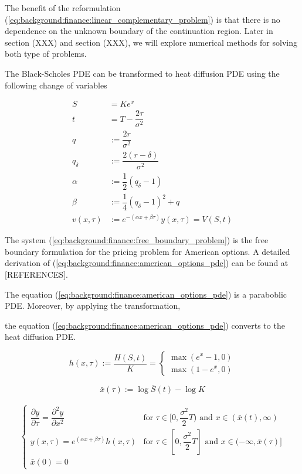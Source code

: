 The benefit of the reformulation (\ref*{eq:background:finance:linear_complementary_problem})
is that there is no dependence on the unknown boundary of the continuation region.
Later in section (XXX) and section (XXX), we will explore numerical methods for solving 
both type of problems.



The Black-Scholes PDE can be transformed to heat diffusion PDE using the following
change of variables

\begin{align*}
  S &= Ke^x \\
  t &= T - \dfrac{2\tau}{\sigma^2} \\ 
  q &:= \dfrac{2r}{\sigma^2} \\
  q_{\delta} &:= \dfrac{2(r-\delta)}{\sigma^2} \\
  \alpha &:= \dfrac{1}{2}(q_{\delta} - 1) \\
  \beta &:= \dfrac{1}{4}(q_{\delta} - 1)^2 + q \\
  v(x, \tau) &:= e^{-(\alpha x + \beta \tau)}y(x, \tau)= V(S, t)
\end{align*}

The system (\ref{eq:background:finance:free_boundary_problem}) 
is the free boundary formulation for the pricing problem for American options.
A detailed derivation of (\ref{eq:background:finance:american_options_pde}) 
can be found at [REFERENCES].


The equation (\ref*{eq:background:finance:american_options_pde}) 
is a paraboblic PDE. Moreover, by applying the transformation,


the equation (\ref*{eq:background:finance:american_options_pde}) converts 
to the heat diffusion PDE.

\begin{equation}
  h(x, \tau) := \dfrac{H(S, t)}{K} = \begin{cases}
    \max(e^{x} - 1, 0)\\
    \max(1 - e^{x}, 0)
  \end{cases} 
\end{equation}

\begin{equation}
  \bar{x}(\tau) := \log{\bar{S}(t)} - \log{K} 
\end{equation}

\begin{align}
  \begin{cases}
    \dfrac{\partial y}{\partial \tau} = \dfrac{\partial^2 y}{\partial x^2} & \text{for $\tau\in[0,\dfrac{\sigma^2}{2}T)$ and $x\in(\bar{x}(t), \infty)$} \\
    y(x, \tau) = e^{(\alpha x + \beta \tau)}h(x, \tau) & \text{for $\tau\in[0, \dfrac{\sigma^2}{2}T]$ and $x\in(-\infty, \bar{x}(\tau)]$} \\
    \bar{x}(0) = 0
  \end{cases}
  \label{eq:background:finance:american_option_heat_equation}
\end{align}


